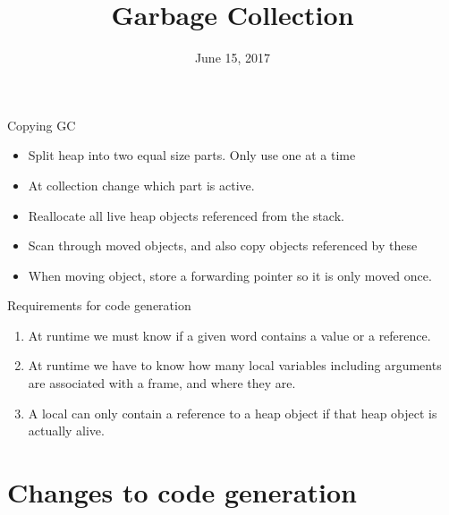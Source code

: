 \documentclass{beamer}
\title{Garbage Collection}
\date{June 15, 2017}
\begin{document}
\maketitle


\begin{frame}{Copying GC}
\begin{itemize}
\item Split heap into two equal size parts. Only use one at a time
\item At collection change which part is active.
\item Reallocate all live heap objects referenced from the stack.
\item Scan through moved objects, and also copy objects referenced by these
\item When moving object, store a forwarding pointer so it is only moved once.
\end{itemize}
\end{frame}

\begin{frame}{Requirements for code generation}
\begin{enumerate}
\item At runtime we must know if a given word contains a value or a
reference.
\item At runtime we have to know how many local variables 
including arguments are 
associated with a frame, and where they are.
\item A local can only contain a reference to a heap object if that
heap object is actually alive.
\end{enumerate}
\end{frame}

\section{Changes to code generation}
\end{document}
